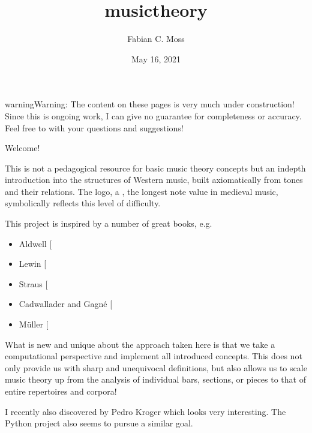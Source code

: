 \documentclass[letterpaper,10pt,english]{sphinxmanual}
\title{musictheory}
\date{May 16, 2021}
\author{Fabian C.\@{} Moss}
\begin{document}
\pagestyle{empty}
\sphinxmaketitle
\pagestyle{plain}
\sphinxtableofcontents
\pagestyle{normal}
\label{\detokenize{index::doc}}


\begin{sphinxadmonition}{warning}{Warning:}
The content on these pages is very much under construction!
Since this is ongoing work, I can give no guarantee for completeness or accuracy.
Feel free to  with your questions and suggestions!
\end{sphinxadmonition}

Welcome!

This is not a pedagogical resource for basic music theory concepts
but an in\sphinxhyphen{}depth introduction into the structures of Western music,
built axiomatically from tones and their relations.
The logo, a , the longest note value in medieval music,
symbolically reflects this level of difficulty.

This project is inspired by a number of great books, e.g.
\begin{itemize}
\item {} 
Aldwell  {[}\sphinxcite{8_bibliography:id4}{]}

\item {} 
Lewin {[}\sphinxcite{8_bibliography:id2}{]}

\item {} 
Straus {[}\sphinxcite{8_bibliography:id3}{]}

\item {} 
Cadwallader and Gagné {[}\sphinxcite{8_bibliography:id5}{]}

\item {} 
Müller {[}\sphinxcite{8_bibliography:id6}{]}

\end{itemize}

What is new and unique about the approach taken here is that we take
a computational perspective and implement all introduced concepts.
This does not only provide us with sharp and unequivocal definitions,
but also allows us to scale music theory up from the analysis of individual
bars, sections, or pieces to that of entire repertoires and corpora!

I recently also discovered  by Pedro Kroger
which looks very interesting.
The Python project  also seems to pursue a similar goal.
\end{document}
